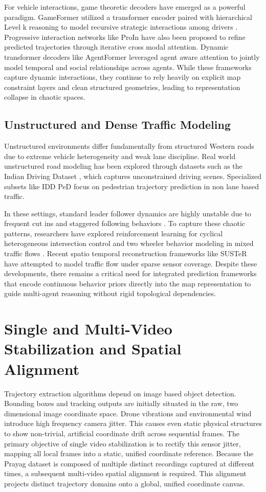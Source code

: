 \documentclass{article}
\begin{document}
For vehicle interactions, game theoretic decoders have emerged as a powerful paradigm. GameFormer utilized a transformer encoder paired with hierarchical Level k reasoning to model recursive strategic interactions among drivers \cite{b10}. Progressive interaction networks like ProIn \cite{b3} have also been proposed to refine predicted trajectories through iterative cross modal attention. Dynamic transformer decoders like AgentFormer \cite{b26} leveraged agent aware attention to jointly model temporal and social relationships across agents. While these frameworks capture dynamic interactions, they continue to rely heavily on explicit map constraint layers and clean structured geometries, leading to representation collapse in chaotic spaces.

\subsection{Unstructured and Dense Traffic Modeling}
Unstructured environments differ fundamentally from structured Western roads due to extreme vehicle heterogeneity and weak lane discipline. Real world unstructured road modeling has been explored through datasets such as the Indian Driving Dataset \cite{b19}, which captures unconstrained driving scenes. Specialized subsets like IDD PeD \cite{b11} focus on pedestrian trajectory prediction in non lane based traffic.

In these settings, standard leader follower dynamics are highly unstable due to frequent cut ins and staggered following behaviors \cite{b12}. To capture these chaotic patterns, researchers have explored reinforcement learning for cyclical heterogeneous intersection control \cite{b13} and two wheeler behavior modeling in mixed traffic flows \cite{b14}. Recent spatio temporal reconstruction frameworks like SUSTeR \cite{b15} have attempted to model traffic flow under sparse sensor coverage. Despite these developments, there remains a critical need for integrated prediction frameworks that encode continuous behavior priors directly into the map representation to guide multi-agent reasoning without rigid topological dependencies.

\section{Single and Multi-Video Stabilization and Spatial Alignment}
Trajectory extraction algorithms depend on image based object detection. Bounding boxes and tracking outputs are initially situated in the raw, two dimensional image coordinate space. Drone vibrations and environmental wind introduce high frequency camera jitter. This causes even static physical structures to show non-trivial, artificial coordinate drift across sequential frames. The primary objective of single video stabilization is to rectify this sensor jitter, mapping all local frames into a static, unified coordinate reference. Because the Prayag dataset is composed of multiple distinct recordings captured at different times, a subsequent multi-video spatial alignment is required. This alignment projects distinct trajectory domains onto a global, unified coordinate canvas.
\end{document}
